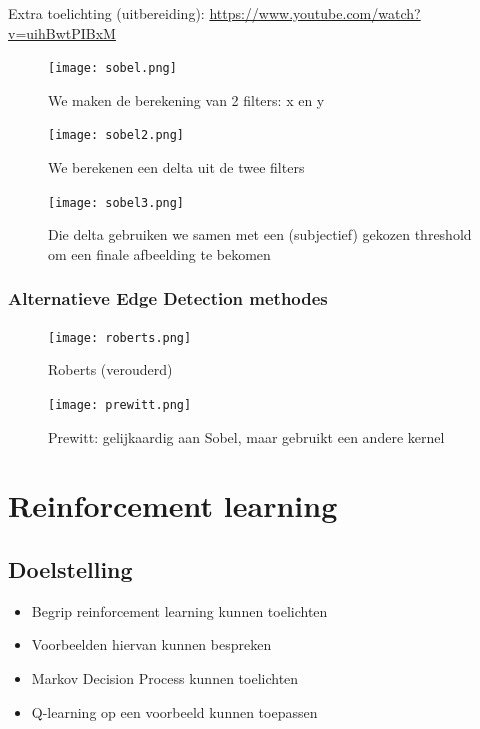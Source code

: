 \documentclass{article}
\begin{document}
Extra toelichting (uitbereiding): \url{https://www.youtube.com/watch?v=uihBwtPIBxM}

\begin{figure}[H]
    \centering
    \texttt{[image: sobel.png]}
    \caption{We maken de berekening van 2 filters: x en y}
\end{figure}

\begin{figure}[H]
    \centering
    \texttt{[image: sobel2.png]}
    \caption{We berekenen een delta uit de twee filters}
\end{figure}

\begin{figure}[H]
    \centering
    \texttt{[image: sobel3.png]}
    \caption{Die delta gebruiken we samen met een (subjectief) gekozen threshold om een finale afbeelding te bekomen}
\end{figure}

\subsubsection{Alternatieve Edge Detection methodes}

\begin{figure}[H]
    \centering
    \texttt{[image: roberts.png]}
    \caption{Roberts (verouderd)}
\end{figure}

\begin{figure}[H]
    \centering
    \texttt{[image: prewitt.png]}
    \caption{Prewitt: gelijkaardig aan Sobel, maar gebruikt een andere kernel}
\end{figure}

\section{Reinforcement learning}

\subsection{Doelstelling}

\begin{itemize}
    \item Begrip reinforcement learning kunnen toelichten
    \item Voorbeelden hiervan kunnen bespreken
    \item Markov Decision Process kunnen toelichten
    \item Q-learning op een voorbeeld kunnen toepassen
\end{itemize}
\end{document}
